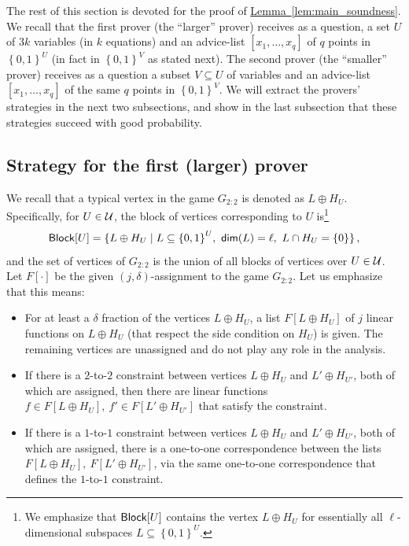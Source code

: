 \documentclass[11pt]{article}
\numberwithin{equation}{section}
\theoremstyle{definition}
\theoremstyle{plain}
\newcommand{\expref}[2]{\hyperref[#2]{#1~\ref{#2}}}
\newcommand\set[1]{{\left\{ #1 \right\}}}
\newcommand\power[1]{\set{0,1}^{#1}}
\newcommand*\xor{\mathbin{\oplus}}
\begin{document}
The rest of this section is devoted for the proof of \expref{Lemma}{lem:main_soundness}.
We recall that the first prover (the ``larger'' prover) receives as a question, a set $U$ of $3k$ variables (in $k$ equations) and an advice-list
$[x_1, \ldots, x_q]$ of $q$ points in $\power{U}$ (in fact in $\power{V}$ as stated next). The second prover (the ``smaller'' prover) receives as a question a subset
$V \subseteq U$ of variables and an advice-list $[x_1, \ldots, x_q]$ of the same $q$ points in $\power{V}$. We will extract the provers' strategies in
the next two subsections, and show in the last subsection that these strategies succeed with good probability.





\subsection{Strategy for the first (larger) prover }
We recall that a typical vertex in the game $G_{2:2}$ is denoted as $L\xor H_U$. Specifically, for $U \in {\cal U}$, the block of
vertices corresponding to $U$ is\footnote{We emphasize that ${\sf Block}[U]$ contains the vertex $L\xor H_U$ for essentially all
$\ell$-dimensional subspaces $L \subseteq \power{U}$.} 
 $$ {\sf Block}[U] = \{ L \xor H_U \mid L \subseteq \power{U}, ~{\sf dim}(L)=\ell, ~L \cap H_U = \{0\} \}\,,$$%
 and the set of vertices of $G_{2:2}$ is the union of all blocks of vertices over $U \in {\cal U}$. Let $F[\cdot]$ be the
 given $(j,\delta)$-assignment to the game $G_{2:2}$. Let us emphasize that this means:
 \begin{itemize}
 \item For at least
 a %
 $\delta$ fraction of the vertices $L \xor H_U$, a
 list $F[L\xor H_U]$ of $j$ linear functions on $L\xor H_U$ (that respect the side condition on $H_U$) is given. The remaining vertices
 are unassigned and do not play any role in the analysis.
 \item If there is a $2$-to-$2$ constraint between vertices $L\xor H_U$ and $L'\xor H_{U'}$, both of which are assigned, then there are linear functions
       $f \in F[L\xor H_U], ~f' \in F[L' \xor H_{U'}]$ that satisfy the constraint.
\item If there is a $1$-to-$1$ constraint between vertices $L\xor H_U$ and $L'\xor H_{U'}$, both of which are assigned, there is a one-to-one correspondence
      between the lists $F[L\xor H_U], ~F[L'\xor H_{U'}]$, via the same one-to-one correspondence that defines the $1$-to-$1$ constraint.
\end{itemize}
\end{document}
